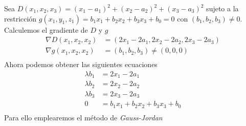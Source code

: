 \documentclass[letterpaper]{article}
\renewcommand{\*}{\cdot}
\theoremstyle{definition}
\begin{document}
Sea $ D(x_1,x_2,x_3) = (x_1 - a_1)^2 + (x_2 - a_2)^2 + (x_3 - a_3)^2 $ sujeto a la restricción $ g(x_1, y_1, z_1) = b_1x_1 + b_2x_2 + b_3 x_3 + b_0 = 0$ con $ (b_1, b_2, b_3) \neq 0  $. Calculemos el gradiente de $ D $ y $ g $
\begin{align*}
	\nabla D(x_1, x_2, x_2) &= (2x_1 - 2a_1, 2x_2 - 2a_2, 2x_3 - 2a_3)\\
	\nabla g(x_1, x_2, x_2) &= (b_1, b_2, b_3) \neq (0,0,0)\\
\end{align*}
Ahora podemos obtener las siguientes ecuaciones
\begin{align*}
	\lambda b_1 &= 2x_1 - 2a_1 \\
	\lambda b_2 &= 2x_2 - 2a_2 \\
	\lambda b_3 &= 2x_3 - 2a_3 \\
	0 &= b_1x_1 + b_2x_2 + b_3x_3 + b_0 \\
\end{align*}
Para ello emplearemos el método de \textit{Gauss-Jordan}
\end{document}
